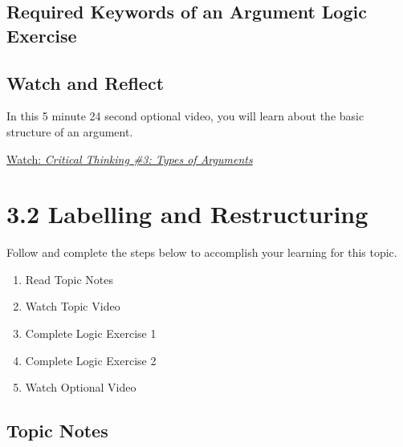 \documentclass[
]{book}
\providecommand{\tightlist}{%
  \setlength{\itemsep}{0pt}\setlength{\parskip}{0pt}}
\begin{document}
\begin{reflect}
\end{reflect}

\hypertarget{required-keywords-of-an-argument-logic-exercise}{%
\subsection*{Required Keywords of an Argument Logic Exercise}\label{required-keywords-of-an-argument-logic-exercise}}

\begin{reflect}
\end{reflect}

\hypertarget{watch-and-reflect-17}{%
\subsection*{Watch and Reflect}\label{watch-and-reflect-17}}

\begin{reflect}
In this 5 minute 24 second optional video, you will learn about the basic structure of an argument.

\href{https://www.youtube.com/watch?v=wbRxR53F3rI}{Watch: \emph{Critical Thinking \#3: Types of Arguments}}
\end{reflect}

\hypertarget{labelling-and-restructuring}{%
\section*{3.2 Labelling and Restructuring}\label{labelling-and-restructuring}}

Follow and complete the steps below to accomplish your learning for this topic.

\begin{enumerate}
\def\labelenumi{\arabic{enumi}.}
\tightlist
\item
  Read Topic Notes
\item
  Watch Topic Video
\item
  Complete Logic Exercise 1
\item
  Complete Logic Exercise 2
\item
  Watch Optional Video
\end{enumerate}

\hypertarget{topic-notes-9}{%
\subsection*{Topic Notes}\label{topic-notes-9}}
\end{document}
